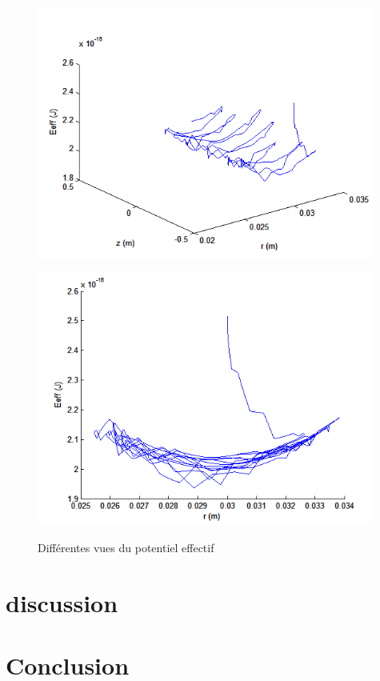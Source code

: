 \documentclass[a4paper,12pt]{article}
\begin{document}
\begin{figure}[h]
   \begin{minipage}[c]{.49\linewidth}
      \includegraphics[width=0.99\textwidth,height=0.8\textwidth]{images/Eeff_3d}
      \label{f Eeff_3d}
   \end{minipage} \hfill
   \begin{minipage}[c]{.49\linewidth}
      \includegraphics[width=0.99\textwidth,height=0.8\textwidth]{images/Eeff_rEeff}
      \label{f Eeff_xy}
   \end{minipage}
   \caption{Différentes vues du potentiel effectif}
   \label{f Eeff}
\end{figure}



\section{discussion}



\section{Conclusion}
\end{document}
